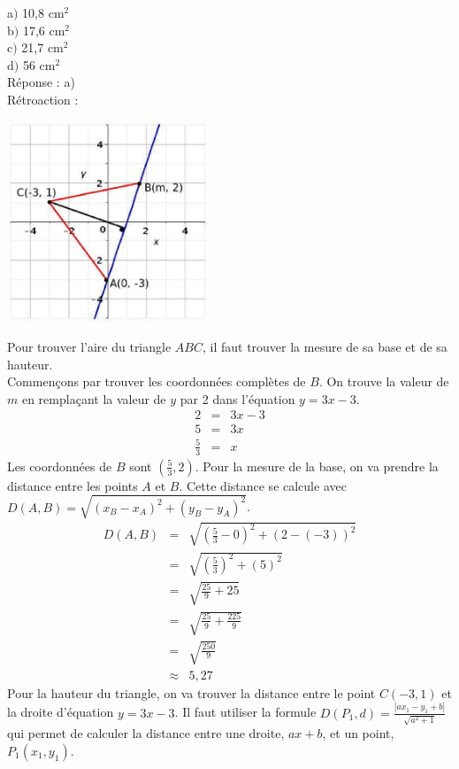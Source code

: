\documentclass[letterpaper, 12pt]{article}
\begin{document}
a$)$ 10,8 cm$^{2}$\\
b$)$ 17,6 cm$^{2}$\\
c$)$ 21,7 cm$^{2}$\\
d$)$ 56 cm$^{2}$\\

R\'eponse : a)\\

R\'etroaction :\\
\begin{center}
 \includegraphics[width=6cm,bb=14 14 415 415]{Q2479r.eps}
\end{center}
Pour trouver l'aire du triangle $ABC$, il faut trouver la mesure de sa base et de sa hauteur. \\
Commen\c cons par trouver les coordonn\'ees compl\`etes de $B$. On trouve la valeur de $m$ en rempla\c cant la valeur de $y$ par 2 dans l'\'equation $y=3x-3$.
\begin{eqnarray*}
 2&=&3x-3\\
 5&=&3x\\[2mm]
 \frac{5}{3}&=&x
\end{eqnarray*}
 Les coordonn\'ees de $B$ sont $(\frac{5}{3}, 2)$. Pour la mesure de la base, on va prendre la distance entre les points $A$ et $B$. Cette distance se calcule avec $D(A, B)=\sqrt{(x_{B}-x_{A})^{2}+(y_{B}-y_{A})^{2}}$.
\begin{eqnarray*}
 D(A, B)&=&\sqrt{\left( \frac{5}{3}-0\right) ^{2}+(2-(-3))^{2}}\\[2mm]
&=&\sqrt{\left(\frac{5}{3}\right) ^{2}+(5)^{2}}\\[2mm]
&=&\sqrt{\frac{25}{9}+25}\\[2mm]
&=&\sqrt{\frac{25}{9}+\frac{225}{9}}\\[2mm]
&=&\sqrt{\frac{250}{9}}\\[2mm]
&\approx&5,27
\end{eqnarray*}
Pour la hauteur du triangle, on va trouver la distance entre le point $C(-3, 1)$ et la droite d'\'equation $y=3x-3$. Il faut utiliser la formule $D(P_{1}, d)=\frac{|ax_{1}-y_{1}+b|}{\sqrt{a^{2}+1}}$ qui permet de calculer la distance entre une droite, $ax+b$, et un point, $P_{1}(x_{1}, y_{1})$.
\end{document}
